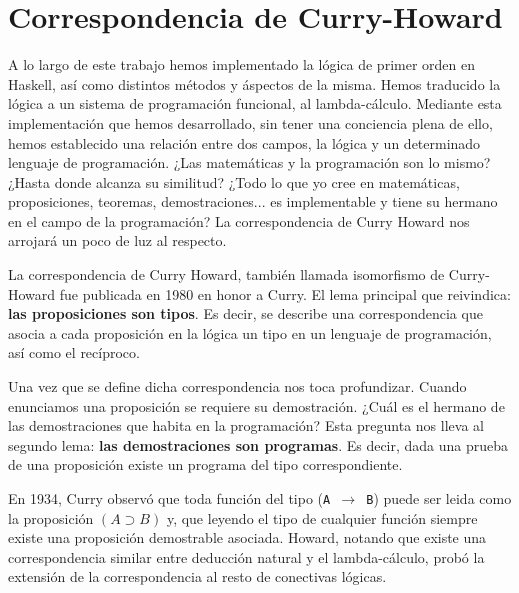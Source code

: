 \chapter{Correspondencia de Curry-Howard}

A lo largo de este trabajo hemos implementado la lógica de primer orden
en Haskell, así como distintos métodos y áspectos de la misma. Hemos
traducido la lógica a un sistema de programación funcional, al lambda-cálculo.
Mediante esta implementación que hemos desarrollado, sin tener una conciencia
plena de ello, hemos establecido una relación entre dos campos, la lógica y
un determinado lenguaje de programación. ¿Las matemáticas y la programación
son lo mismo? ¿Hasta donde alcanza su similitud? ¿Todo lo que yo cree en
matemáticas, proposiciones, teoremas, demostraciones... es implementable y
tiene su hermano en el campo de la programación? La correspondencia de Curry
Howard nos arrojará un poco de luz al respecto.

\vspace{5mm}

La correspondencia de Curry Howard, también llamada isomorfismo de Curry-Howard
fue publicada en 1980 en honor a Curry. El lema principal que reivindica:
\textbf{las proposiciones son tipos}. Es decir, se describe una correspondencia
que asocia a cada proposición en la lógica un tipo en un lenguaje de programación,
así como el recíproco.

\vspace{5mm}
Una vez que se define dicha correspondencia nos toca profundizar. Cuando
enunciamos una proposición se requiere su demostración. ¿Cuál es el hermano
de las demostraciones que habita en la programación? Esta pregunta nos lleva al segundo
lema: \textbf{las demostraciones son programas}. Es decir, dada una prueba de
una proposición existe un programa del tipo correspondiente.

\vspace{5mm}


En 1934, Curry observó que toda función del tipo (\texttt{A $\rightarrow$ B})
puede ser leida como la proposición $(A\supset B)$ y, que leyendo el tipo de
cualquier función siempre existe una proposición demostrable asociada. Howard,
notando que existe una correspondencia similar entre deducción natural y el
lambda-cálculo, probó la extensión de la correspondencia al resto de conectivas lógicas.

